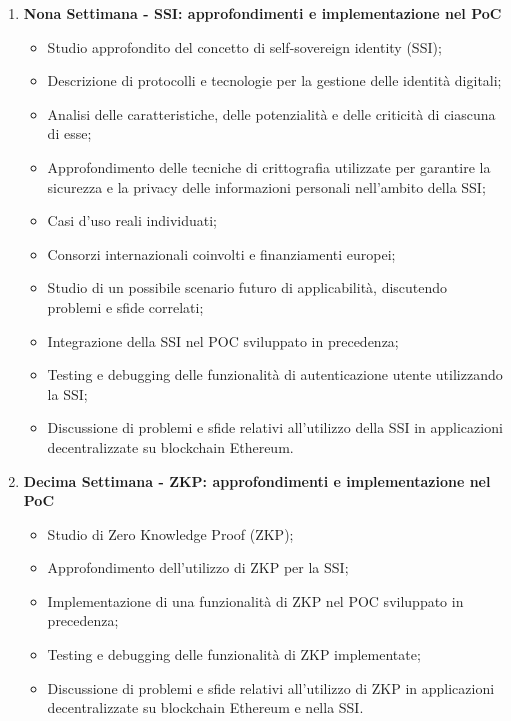 {\begin{enumerate}
        \newpage

        \item \textbf{Nona Settimana - SSI: approfondimenti e implementazione nel PoC}
        \begin{itemize}
            \item Studio approfondito del concetto di self-sovereign identity (SSI);
            \item Descrizione di protocolli e tecnologie per la gestione delle identità digitali;
            \item Analisi delle caratteristiche, delle potenzialità e delle criticità di ciascuna di esse;
            \item Approfondimento delle tecniche di crittografia utilizzate per garantire la sicurezza e la privacy delle informazioni personali nell'ambito della SSI;
            \item Casi d'uso reali individuati;
            \item Consorzi internazionali coinvolti e finanziamenti europei;
            \item Studio di un possibile scenario futuro di applicabilità, discutendo problemi e sfide correlati;
            \item Integrazione della SSI nel POC sviluppato in precedenza;
            \item Testing e debugging delle funzionalità di autenticazione utente utilizzando la SSI;
            \item Discussione di problemi e sfide relativi all'utilizzo della SSI in applicazioni decentralizzate su blockchain Ethereum.
        \end{itemize}

        \item \textbf{Decima Settimana - ZKP: approfondimenti e implementazione nel PoC}
        \begin{itemize}
            \item Studio di Zero Knowledge Proof (ZKP);
            \item Approfondimento dell'utilizzo di ZKP per la SSI;
            \item Implementazione di una funzionalità di ZKP nel POC sviluppato in precedenza;
            \item Testing e debugging delle funzionalità di ZKP implementate;
            \item Discussione di problemi e sfide relativi all'utilizzo di ZKP in applicazioni decentralizzate su blockchain Ethereum e nella SSI.
        \end{itemize}   


\end{enumerate}}
